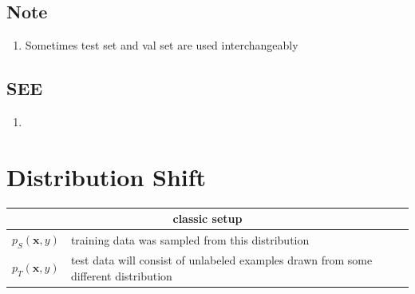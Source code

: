 \vspace{0.2cm}


\subsection*{Note}

\begin{enumerate}
    \item Sometimes test set and val set are used interchangeably
\end{enumerate}

\subsection*{SEE}
\begin{enumerate}
    \item {}
\end{enumerate}



\section{Distribution Shift \cite{dnn-1,mit-imbalance-outliers-shift}}

\begin{customTableWrapper}{1.5}
\begin{table}[H]
    \centering
    \begin{tabular}{l p{6cm}}
        \hline
        \multicolumn{2}{|c|}{classic setup} \\ 
        \hline

        $p_S(\mathbf{x},y)$ & training data was sampled from this distribution \\

        $p_T(\mathbf{x},y)$ & test data will consist of unlabeled examples drawn from some different distribution \\

        
    \end{tabular}
\end{table}
\end{customTableWrapper}


